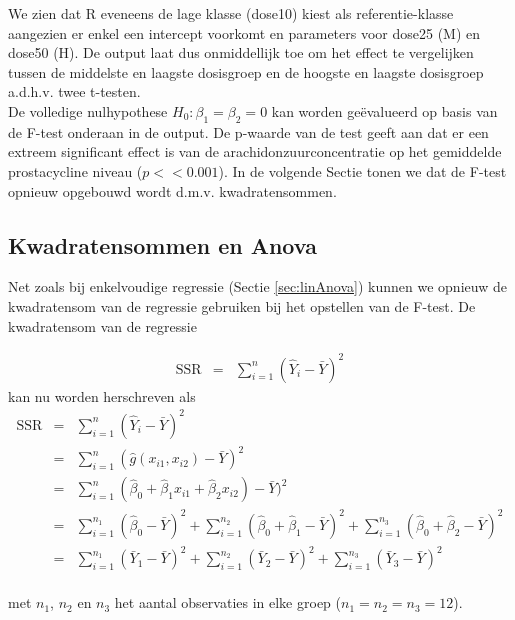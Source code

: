 \documentclass[
  12pt,dutch]{book}
\theoremstyle{definition}
\theoremstyle{definition}
\theoremstyle{definition}
\theoremstyle{definition}
\theoremstyle{remark}
\begin{document}
We zien dat R eveneens de lage klasse (dose10) kiest als referentie-klasse aangezien er enkel een intercept voorkomt en parameters voor dose25 (M) en dose50 (H).
De output laat dus onmiddellijk toe om het effect te vergelijken tussen de middelste en laagste dosisgroep en de hoogste en laagste dosisgroep a.d.h.v. twee t-testen.\\
De volledige nulhypothese \(H_0: \beta_1=\beta_2=0\) kan worden geëvalueerd op basis van de F-test onderaan in de output.
De p-waarde van de test geeft aan dat er een extreem significant effect is van de arachidonzuurconcentratie op het gemiddelde prostacycline niveau (\(p<<0.001\)).
In de volgende Sectie tonen we dat de F-test opnieuw opgebouwd wordt d.m.v. kwadratensommen.

\subsection{Kwadratensommen en Anova}\label{kwadratensommen-en-anova}

Net zoals bij enkelvoudige regressie (Sectie \ref{sec:linAnova}) kunnen we opnieuw de kwadratensom van de regressie gebruiken bij het opstellen van de F-test.
De kwadratensom van de regressie

\begin{eqnarray*}
\text{SSR}&=&\sum\limits_{i=1}^n (\hat Y_{i} -\bar Y)^2
\end{eqnarray*}
kan nu worden herschreven als
\begin{eqnarray*}
\text{SSR}&=&\sum\limits_{i=1}^n (\hat Y_i -\bar Y)^2\\
&=& \sum\limits_{i=1}^n (\hat{g} (x_{i1},x_{i2}) - \bar Y)^2\\
&=& \sum\limits_{i=1}^n (\hat\beta_0+\hat\beta_1x_{i1}+\hat\beta_2x_{i2}) - \bar Y)^2\\
&=& \sum\limits_{i=1}^{n_1} (\hat\beta_0 - \bar Y)^2 +\sum\limits_{i=1}^{n_2} (\hat\beta_0 + \hat\beta_1 - \bar Y)^2+\sum\limits_{i=1}^{n_3} (\hat\beta_0 + \hat\beta_2 - \bar Y)^2\\
&=& \sum\limits_{i=1}^{n_1} (\bar Y_1- \bar Y)^2 +\sum\limits_{i=1}^{n_2} (\bar Y_2- \bar Y)^2+\sum\limits_{i=1}^{n_3} (\bar Y_3 - \bar Y)^2\\
\end{eqnarray*}

met \(n_1\), \(n_2\) en \(n_3\) het aantal observaties in elke groep (\(n_1=n_2=n_3=12\)).
\end{document}
